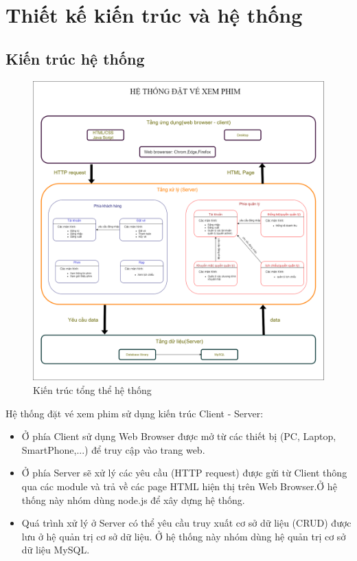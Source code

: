 \documentclass[a4paper, 12pt]{article}
\begin{document}
\section{Thiết kế kiến trúc và hệ thống}

\subsection{Kiến trúc hệ thống}
\begin{figure}[H]
	\begin{center}
		\includegraphics[scale = 0.25]{image/4.1.png}
		\caption{Kiến trúc tổng thể hệ thống}
	\end{center}
\end{figure}

Hệ thống đặt vé xem phim sử dụng kiến trúc Client - Server:
\begin{itemize}
	\item Ở phía Client sử dụng Web Browser được mở từ các thiết bị (PC, Laptop, SmartPhone,...) để truy cập vào trang web.
	\item Ở phía Server sẽ xử lý các yêu cầu (HTTP request) được gửi từ Client thông qua các module và trả về các page HTML hiện thị trên Web Browser.Ở hệ thống này nhóm dùng node.js để xây dựng hệ thống.
	\item Quá trình xử lý ở Server có thể yêu cầu truy xuất cơ sở dữ liệu (CRUD) được lưu ở hệ quản trị cơ sở dữ liệu. Ở hệ thống này nhóm dùng hệ quản trị cơ sở dữ liệu MySQL.
\end{itemize}
\end{document}
